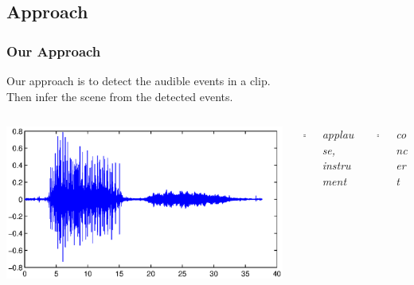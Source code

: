 \documentclass[xcolor=table,slidestop,compress,mathserif]{beamer}
\begin{document}
\subsection{Approach}
\begin{frame}
  \frametitle{Our Approach}
	Our approach is to detect the audible events in a clip. \\
	Then infer the scene from the detected events. 	
		
	\vspace{0.5cm}
	\begin{columns}[c]
		\begin{column}{0.5\textwidth}
			\includegraphics[scale=0.4]{./figure/tune_part.eps}
		\end{column}
		\begin{column}{0.05\textwidth}
			$\Rightarrow$
		\end{column}
		\begin{column}{0.2\textwidth}
			\em{applause, instrument}
		\end{column}
		\begin{column}{0.05\textwidth}
			$\Rightarrow$
		\end{column}
		\begin{column}{0.2\textwidth}
			\em{concert}
		\end{column}
	\end{columns}

\end{frame}
\end{document}
